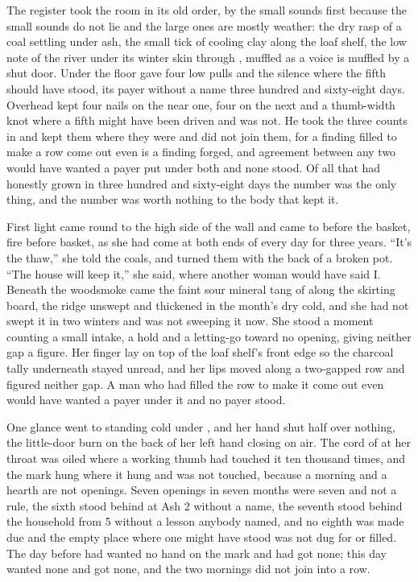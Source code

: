 The register took the room in its old order, by the small sounds first because the small sounds do not lie and the large ones are mostly weather: the dry rasp of a coal settling under ash, the small tick of cooling clay along the loaf shelf, the low note of the river under its winter skin through , muffled as a voice is muffled by a shut door. Under the floor  gave four low pulls and the silence where the fifth should have stood, its payer without a name three hundred and sixty-eight days. Overhead  kept four nails on the near one, four on the next and a thumb-width knot where a fifth might have been driven and was not. He took the three counts in and kept them where they were and did not join them, for a finding filled to make a row come out even is a finding forged, and agreement between any two would have wanted a payer put under both and none stood. Of all that had honestly grown in three hundred and sixty-eight days the number was the only thing, and the number was worth nothing to the body that kept it.

\scenebreak

First light came round to the high side of the wall and  came to  before the basket, fire before basket, as she had come at both ends of every day for three years. “It's the thaw,” she told the coals, and turned them with the back of a broken pot. “The house will keep it,” she said, where another woman would have said I. Beneath the woodsmoke came the faint sour mineral tang of  along the skirting board, the ridge unswept and thickened in the month's dry cold, and she had not swept it in two winters and was not sweeping it now. She stood a moment counting a small intake, a hold and a letting-go toward no opening, giving neither gap a figure. Her finger lay on top of the loaf shelf's front edge so the charcoal tally underneath stayed unread, and her lips moved along a two-gapped row and figured neither gap. A man who had filled the row to make it come out even would have wanted a payer under it and no payer stood.

One glance went to  standing cold under , and her hand shut half over nothing, the little-door burn on the back of her left hand closing on air. The cord of  at her throat was oiled where a working thumb had touched it ten thousand times, and the mark hung where it hung and was not touched, because a morning and a hearth are not openings. Seven openings in seven months were seven and not a rule, the sixth stood behind at Ash 2 without a name, the seventh stood behind the household from  5 without a lesson anybody named, and no eighth was made due and the empty place where one might have stood was not dug for or filled. The day before had wanted no hand on the mark and had got none; this day wanted none and got none, and the two mornings did not join into a row.

